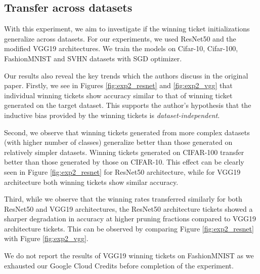     \subsection{Transfer across datasets}
    With this experiment, we aim to investigate if the winning ticket initializations generalize across datasets. For our experiments, we used ResNet50 and the modified VGG19 architectures. We train the models on Cifar-10, Cifar-100, FashionMNIST and SVHN datasets with SGD optimizer. 
    
    Our results also reveal the key trends which the authors discuss in the original paper. Firstly, we see in Figures \ref{fig:exp2_resnet} and \ref{fig:exp2_vgg} that individual winning tickets show accuracy similar to that of winning ticket generated on the target dataset. This supports the author's hypothesis that the inductive bias provided by the winning tickets is \textit{dataset-independent}.  
    
    Second, we observe that winning tickets generated from more complex datasets (with higher number of classes) generalize better than those generated on relatively simpler datasets. Winning tickets generated on CIFAR-100 transfer better than those generated by those on CIFAR-10. This effect can be clearly seen in Figure \ref{fig:exp2_resnet} for ResNet50 architecture, while for VGG19 architecture both winning tickets show similar accuracy.
    
    Third, while we observe that the winning rates transferred similarly for both ResNet50 and VGG19 architectures, the ResNet50 architecture tickets showed a sharper degradation in accuracy at higher pruning fractions compared to VGG19 architecture tickets. This can be observed by comparing Figure \ref{fig:exp2_resnet} with Figure \ref{fig:exp2_vgg}.
    
    We do not report the results of VGG19 winning tickets on FashionMNIST as we exhausted our Google Cloud Credits before completion of the experiment. 
    

